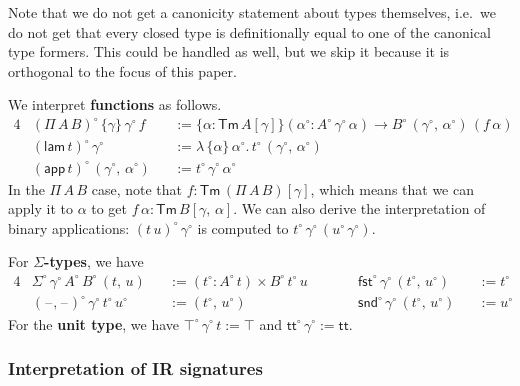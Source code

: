 \documentclass[acmsmall,screen,review,anonymous]{acmart}
\newcommand{\msf}[1]{{\mathsf{#1}}}
\newcommand{\ttt}{\msf{tt}}
\newcommand{\blank}{{\mathord{\hspace{1pt}\text{--}\hspace{1pt}}}}
\newcommand{\fst}{\msf{fst}}
\newcommand{\snd}{\msf{snd}}
\newcommand{\Tm}{\msf{Tm}}
\newcommand{\w}{\circ}
\newcommand{\lam}{\msf{lam}}
\newcommand{\app}{\msf{app}}
\begin{document}
Note that we do not get a canonicity statement about types themselves, i.e.\ we do not get that
every closed type is definitionally equal to one of the canonical type formers. This could be handled
as well, but we skip it because it is orthogonal to the focus of this paper.

We interpret \textbf{functions} as follows.
\begin{alignat*}{4}
  &(\Pi\,A\,B)^\w\,\{\gamma\}\,\gamma^\w\,f &&:= \{\alpha : \Tm\,A[\gamma]\}(\alpha^\w : A^\w\,\gamma^\w\,\alpha) \to B^\w\,(\gamma^\w,\,\alpha^\w)\,(f\,\alpha)\\
  &(\lam\,t)^\w\,\gamma^\w &&:= \lambda\,\{\alpha\}\,\alpha^\w.\,t^\w\,(\gamma^\w,\,\alpha^\w)\\
  &(\app\,t)^\w\,(\gamma^\w,\,\alpha^\w) &&:= t^\w\,\gamma^\w\,\alpha^\w
\end{alignat*}
In the $\Pi\,A\,B$ case, note that $f : \Tm\,(\Pi\,A\,B)[\gamma]$, which means that we can apply it
to $\alpha$ to get $f\,\alpha : \Tm\,B[\gamma,\,\alpha]$. We can also derive the interpretation of
binary applications: $(t\,u)^\w\,\gamma^\w$ is computed to $t^\w\,\gamma^\w\,(u^\w\,\gamma^\w)$.

For \textbf{$\Sigma$-types}, we have
\begin{alignat*}{4}
  &\Sigma^\w\,\gamma^\w\,A^\w\,B^\w\,(t,\,u)   &&:= (t^\w : A^\w\,t) \times B^\w\,t^\w\,u\hspace{2em}  && \fst^\w\,\gamma^\w\,(t^\w,\,u^\w) &&:= t^\w \\
  &(\blank,\blank)^\w\,\gamma^\w\,t^\w\,u^\w   &&:= (t^\w,\,u^\w)                                     && \snd^\w\,\gamma^\w\,(t^\w,\,u^\w) &&:= u^\w
\end{alignat*}
For the \textbf{unit type}, we have $\top^\w\,\gamma^\w\,t := \top$ and $\ttt^\w\,\gamma^\w := \ttt$.

\subsubsection{Interpretation of IR signatures}
\end{document}
